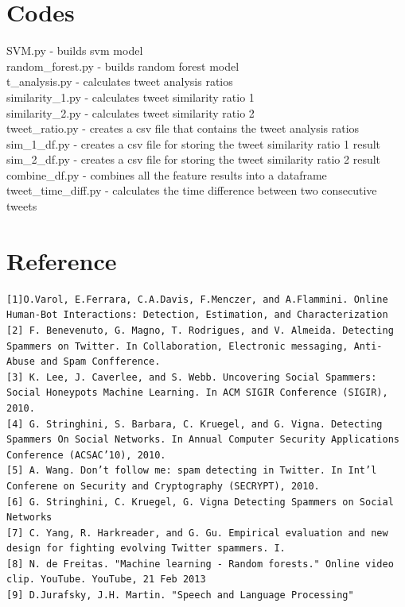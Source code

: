 \documentclass[a4paper, 12pt]{report}
\begin{document}
\newpage
\section*{Codes}
SVM.py - builds svm model\\
random\_forest.py - builds random forest model\\
t\_analysis.py - calculates tweet analysis ratios\\
similarity\_1.py - calculates tweet similarity ratio 1\\
similarity\_2.py - calculates tweet similarity ratio 2\\
tweet\_ratio.py - creates a csv file that contains the tweet analysis ratios\\
sim\_1\_df.py - creates a csv file for storing the tweet similarity ratio 1 result\\
sim\_2\_df.py - creates a csv file for storing the tweet similarity ratio 2 result\\
combine\_df.py - combines all the feature results into a dataframe\\
tweet\_time\_diff.py - calculates the time difference between two consecutive tweets\\


\newpage
\section*{Reference}
\begin{lstlisting}
[1]O.Varol, E.Ferrara, C.A.Davis, F.Menczer, and A.Flammini. Online Human-Bot Interactions: Detection, Estimation, and Characterization
[2] F. Benevenuto, G. Magno, T. Rodrigues, and V. Almeida. Detecting Spammers on Twitter. In Collaboration, Electronic messaging, Anti-Abuse and Spam Confference.
[3] K. Lee, J. Caverlee, and S. Webb. Uncovering Social Spammers: Social Honeypots Machine Learning. In ACM SIGIR Conference (SIGIR), 2010.
[4] G. Stringhini, S. Barbara, C. Kruegel, and G. Vigna. Detecting Spammers On Social Networks. In Annual Computer Security Applications Conference (ACSAC’10), 2010.
[5] A. Wang. Don’t follow me: spam detecting in Twitter. In Int’l Conferene on Security and Cryptography (SECRYPT), 2010.
[6] G. Stringhini, C. Kruegel, G. Vigna Detecting Spammers on Social Networks
[7] C. Yang, R. Harkreader, and G. Gu. Empirical evaluation and new design for fighting evolving Twitter spammers. I.
[8] N. de Freitas. "Machine learning - Random forests." Online video clip. YouTube. YouTube, 21 Feb 2013
[9] D.Jurafsky, J.H. Martin. "Speech and Language Processing"
 
\end{lstlisting}
\end{document}
